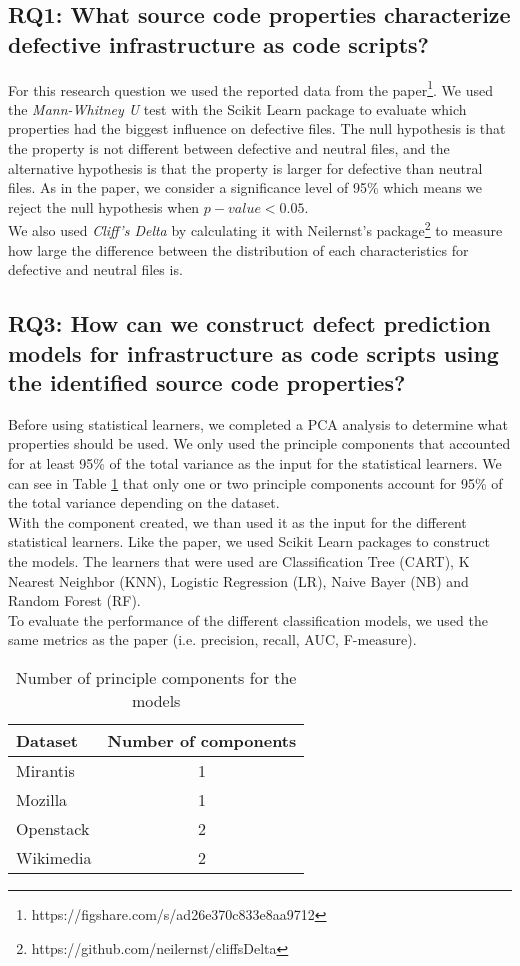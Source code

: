 \subsection{RQ1: What source code properties characterize defective infrastructure as code scripts?}
For this research question we used the reported data from the
paper\footnote{https://figshare.com/s/ad26e370c833e8aa9712}.
We used the \emph{Mann-Whitney U} test with the Scikit Learn package
to evaluate which properties had the biggest influence on defective files.
The null hypothesis is that the property is not different between defective and
neutral files, and the alternative hypothesis is that the property is larger for
defective than neutral files. As in the paper, we consider a significance level of
95\% which means we reject the null hypothesis when $ p-value < 0.05 $. \\

We also used \emph{Cliff's Delta} by calculating it with Neilernst's package\footnote{https://github.com/neilernst/cliffsDelta}
to measure how large the difference between the distribution of each characteristics
for defective and neutral files is.

\subsection{RQ3: How can we construct defect prediction models for
    infrastructure as code scripts using the identified source code properties?}
Before using statistical learners, we completed a PCA analysis to determine
what properties should be used. We only used the principle components that accounted
for at least 95\% of the total variance as the input for the statistical learners.
We can see in Table \ref{table:pca} that only one or two principle components
account for 95\% of the total variance depending on the dataset. \\

With the component created, we than used it as the input for the different
statistical learners. Like the paper, we used Scikit Learn packages to construct
the models. The learners that were used are Classification Tree (CART),
K Nearest Neighbor (KNN), Logistic Regression (LR), Naive Bayer (NB) and
Random Forest (RF). \\

To evaluate the performance of the different classification models, we used the
same metrics as the paper (i.e. precision, recall, AUC, F-measure).

\begin{table}[h]
    \caption{Number of principle components for the models}
    \label{table:pca}
    \centering
    \begin{tabular}{|l|c|}
        \hline
        Dataset   & Number of components \\ \hline
        Mirantis  & 1                    \\ \hline
        Mozilla   & 1                    \\ \hline
        Openstack & 2                    \\ \hline
        Wikimedia & 2                    \\ \hline
    \end{tabular}
\end{table}
